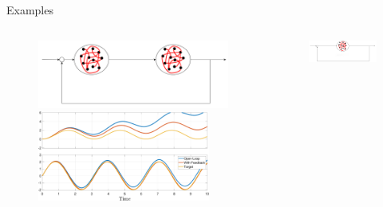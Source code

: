 \documentclass[17pt, t, lualatex]{beamer}
\begin{document}
\begin{frame}



\end{frame}


\begin{frame}{Examples}
	\vspace{-1.5cm}
	\begin{columns}
		\begin{column}{0.45\textwidth}
			\begin{figure}
				\centering
				\includegraphics[scale = 0.15]{figures/control_3.png}
				\includegraphics[width = 0.9\textwidth]{figures/plots/everything/feedback_2_nets.pdf}
			\end{figure}
		\end{column}
		\begin{column}{0.45\textwidth}
			\begin{figure}
				\centering
				\includegraphics[scale = 0.12]{figures/control_4.png}

\end{figure}
\end{column}
\end{columns}
\end{frame}
\end{document}
